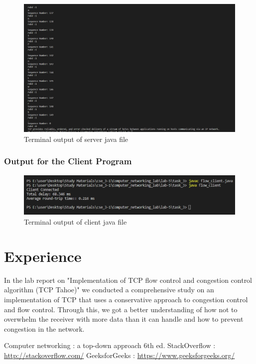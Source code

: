 \documentclass[11pt]{article}
\begin{document}
\begin{figure}[!h]
\centering
\includegraphics[width=\textwidth]{af_server3.png}
\caption{Terminal output of server java file }
\end{figure}
\FloatBarrier

\subsubsection{Output for the Client Program}

\begin{figure}[!h]
\centering
\includegraphics[width=\textwidth]{af_client.png}
\caption{Terminal output of client java file }
\end{figure}
\FloatBarrier


\section{Experience}
In the lab report on "Implementation of TCP flow control and congestion control algorithm (TCP Tahoe)" we conducted a comprehensive study on an implementation of TCP that uses a conservative approach to congestion control and flow control. Through this, we got a better understanding of how not to overwhelm the receiver with more data than it can handle and how to prevent congestion in the network. 



\begin{thebibliography}{1}
  Computer networking : a top-down approach 6th ed.
 StackOverflow : \url{http://stackoverflow.com/}
 GeeksforGeeks : \url{https://www.geeksforgeeks.org/}
\end{thebibliography}
\end{document}
